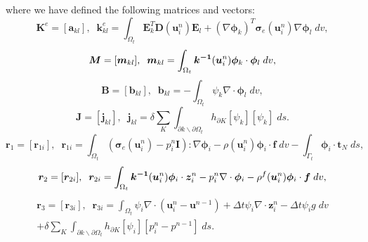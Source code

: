  where we have defined the following matrices and vectors:
 \begin{equation*}
  \boldsymbol{K}^{e}=[\boldsymbol{a}_{kl}], \;\; \boldsymbol{k}^{e}_{kl}=\int_{{\Omega_{t} }} \boldsymbol{E}^{T}_{k}\boldsymbol{D}(\boldsymbol{u}^{n}_{i})\boldsymbol{E}_{l}+  (\nabla \boldsymbol{\phi}_{k})^{T}\boldsymbol{\sigma}_{e}(\boldsymbol{u}^{n}_{i})\nabla \boldsymbol{\phi}_{l}  \; dv,
 \end{equation*}
 \begin{equation*}
  \boldsymbol{M}=[\boldsymbol{m}_{kl}], \;\; \boldsymbol{m}_{kl}=\int_{{\Omega_{t} }} \boldsymbol{k^{-1}}(\boldsymbol{u}^{n}_{i})  \boldsymbol{\phi}_{k} \cdot  \boldsymbol{\phi}_{l} \; dv,
 \end{equation*}
\begin{equation*}
  \boldsymbol{B}=[\boldsymbol{b}_{kl}], \;\; \boldsymbol{b}_{kl}=-\int_{{\Omega_{t} }}  {\psi}_{k} \nabla \cdot \boldsymbol{\phi}_{l} \; dv,
 \end{equation*}
 \begin{equation*}
  \boldsymbol{J}=[\boldsymbol{j}_{kl}], \;\; \boldsymbol{j}_{kl}= \delta \sum_{K} \int_{\partial k \backslash \partial {\Omega_{t} }} h_{\partial K} [{\psi}_{k}][{\psi}_{k}] \;ds.
 \end{equation*}
  \begin{equation*}
  \boldsymbol{r}_{1}=[\boldsymbol{r}_{1i}], \;\; \boldsymbol{r}_{1i}=  \int_{{\Omega_{t}}} \left(\boldsymbol{\sigma}_{e}(\boldsymbol{u}^{n}_{i})-p^{n}_{i} \boldsymbol{I} \right) : \nabla \boldsymbol{\phi}_{i}  - {\rho}(\boldsymbol{u}^{n}_{i})  \boldsymbol{\phi}_{i}\cdot \boldsymbol{f}  \; dv - \int_{\Gamma_{t}}    \boldsymbol{\phi}_{i} \cdot \boldsymbol{t}_{N}    \; ds,
 \end{equation*}
  \begin{equation*}
  \boldsymbol{r}_{2}=[\boldsymbol{r}_{2i}], \;\; \boldsymbol{r}_{2i}= \int_{{\Omega_{t}}}  \boldsymbol{k^{-1}}(\boldsymbol{u}^{n}_{i}) \boldsymbol{\phi}_{i} \cdot \boldsymbol{z}^{n}_{i}  -{p}^{n}_{i} \nabla \cdot \boldsymbol{\phi}_{i} -{\rho^{f}}(\boldsymbol{u}^{n}_{i}) \boldsymbol{\phi}_{i}\cdot \boldsymbol{f}  \; dv ,
 \end{equation*}
  \begin{multline*}
  \boldsymbol{r}_{3}=[\boldsymbol{r}_{3i}], \;\; \boldsymbol{r}_{3i}= \int_{{\Omega_{t}}}  {\psi}_{i}   \nabla \cdot  \left( {\boldsymbol{u}^{n}_{i}-\boldsymbol{u}^{n-1}} \right) +  \Delta t {\psi}_{i}  \nabla \cdot \boldsymbol{z}^{n}_{i}   - \Delta t{\psi}_{i} g  \; dv \\ + \delta \sum_{K} \int_{\partial k \backslash \partial {\Omega_{t} }} h_{\partial K} [{\psi}_{i}]\left[{{p}^{n}_{i}-{p}^{n-1}}\right] \;ds.
 \end{multline*}
